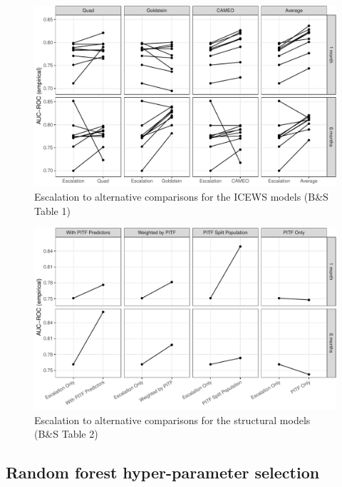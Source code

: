 \documentclass[
]{article}
\begin{document}
\begin{figure}

{\centering \includegraphics[width=.9\linewidth]{paper_files/figure-latex/table1-plot-1} 

}

\caption{Escalation to alternative comparisons for the ICEWS models (B\&S Table 1)}\label{fig:table1-plot}
\end{figure}

\begin{figure}

{\centering \includegraphics[width=.9\linewidth]{paper_files/figure-latex/table2-plot-1} 

}

\caption{Escalation to alternative comparisons for the structural models (B\&S Table 2)}\label{fig:table2-plot}
\end{figure}

\hypertarget{random-forest-hyper-parameter-selection}{%
\subsection{Random forest hyper-parameter selection}\label{random-forest-hyper-parameter-selection}}
\end{document}
